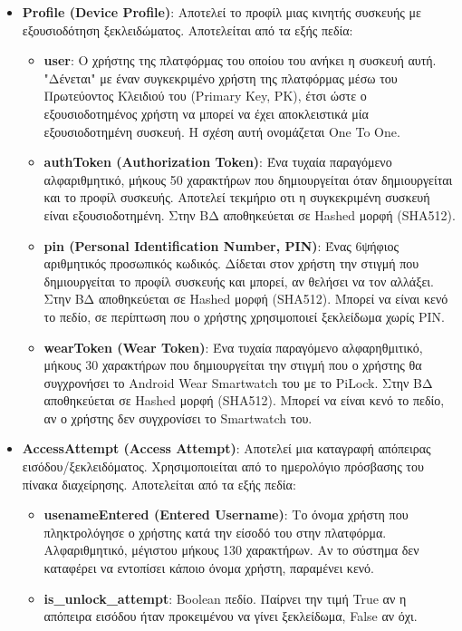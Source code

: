	\begin{itemize}
		\item \textbf{Profile (Device Profile)}: Αποτελεί το προφίλ μιας κινητής συσκευής με εξουσιοδότηση ξεκλειδώματος. Αποτελείται από τα εξής πεδία:
		\begin{itemize}
			\item \textbf{user}: Ο χρήστης της πλατφόρμας του οποίου του ανήκει η συσκευή αυτή. "Δένεται" με έναν συγκεκριμένο χρήστη της πλατφόρμας μέσω του Πρωτεύοντος Κλειδιού του (Primary Key, PK), έτσι ώστε ο εξουσιοδοτημένος χρήστη να μπορεί να έχει αποκλειστικά μία εξουσιοδοτημένη συσκευή. Η σχέση αυτή ονομάζεται One To One.
			\item \textbf{authToken (Authorization Token)}: Ένα τυχαία παραγόμενο αλφαριθμητικό, μήκους 50 χαρακτήρων που δημιουργείται όταν δημιουργείται και το προφίλ συσκευής. Αποτελεί τεκμήριο οτι η συγκεκριμένη συσκευή είναι εξουσιοδοτημένη. Στην ΒΔ αποθηκεύεται σε Hashed μορφή (SHA512). 
			\item \textbf{pin (Personal Identification Number, PIN)}: Ένας 6ψήφιος αριθμητικός προσωπικός κωδικός. Δίδεται στον χρήστη την στιγμή που δημιουργείται το προφίλ συσκευής και μπορεί, αν θελήσει να τον αλλάξει. Στην ΒΔ αποθηκεύεται σε Hashed μορφή (SHA512). Μπορεί να είναι κενό το πεδίο, σε περίπτωση που ο χρήστης χρησιμοποιεί ξεκλείδωμα χωρίς PIN.
			\item \textbf{wearToken (Wear Token)}: Ένα τυχαία παραγόμενο αλφαρηθμιτικό, μήκους 30 χαρακτήρων που δημιουργείται την στιγμή που ο χρήστης θα συγχρονήσει το Android Wear Smartwatch του με το PiLock. Στην ΒΔ αποθηκεύεται σε Hashed μορφή (SHA512). Μπορεί να είναι κενό το πεδίο, αν ο χρήστης δεν συγχρονίσει το Smartwatch του.
		\end{itemize}
		\item \textbf{AccessAttempt (Access Attempt)}: Αποτελεί μια καταγραφή απόπειρας εισόδου/ξεκλειδόματος. Χρησιμοποιείται από το ημερολόγιο πρόσβασης του πίνακα διαχείρησης. Αποτελείται από τα εξής πεδία:
		\begin{itemize}
			\item \textbf{usenameEntered (Entered Username)}: Το όνομα χρήστη που πληκτρολόγησε ο χρήστης κατά την είσοδό του στην πλατφόρμα. Αλφαριθμητικό, μέγιστου μήκους 130 χαρακτήρων. Αν το σύστημα δεν καταφέρει να εντοπίσει κάποιο όνομα χρήστη, παραμένει κενό.
			\item \textbf{is\_unlock\_attempt}: Boolean πεδίο. Παίρνει την τιμή True αν η απόπειρα εισόδου ήταν προκειμένου να γίνει ξεκλείδωμα, False αν όχι.

\end{itemize}
\end{itemize}
